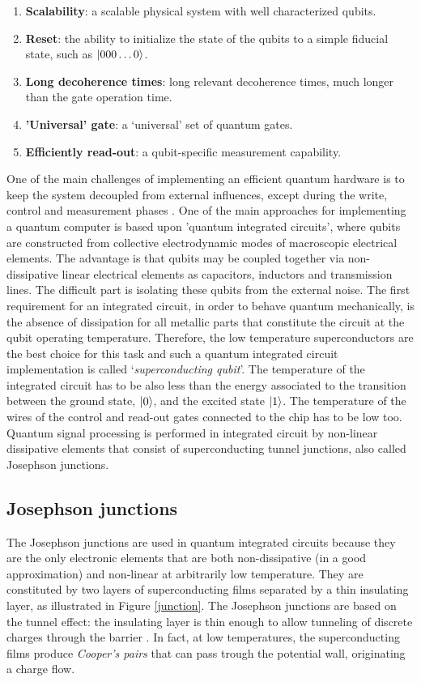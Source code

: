 \begin{enumerate}
	\item \textbf{Scalability}: a scalable physical system with well characterized qubits.
	\item \textbf{Reset}: the ability to initialize the state of the qubits to a simple fiducial state, such as $\left| 000\dots0 \right \rangle$.
	\item \textbf{Long decoherence times}: long relevant decoherence times, much longer than the gate operation time.	
	\item \textbf{'Universal' gate}: a `universal' set of quantum gates.
	\item \textbf{Efficiently read-out}: a qubit-specific measurement capability.
\end{enumerate}

One of the main challenges of implementing an efficient quantum hardware is to keep the system decoupled from external influences, except during the write, control and measurement phases \cite{Hardware} . One of the main approaches for implementing a quantum computer is based upon 'quantum integrated circuits', where qubits are constructed from collective electrodynamic modes of macroscopic electrical elements. The advantage is that qubits may be coupled together via non-dissipative linear electrical elements as capacitors, inductors and transmission lines. The difficult part is isolating these qubits from the external noise. 
The first requirement for an integrated circuit, in order to behave quantum mechanically, is the absence of dissipation for all metallic parts that constitute the circuit at the qubit operating temperature. 
Therefore, the low temperature superconductors are the best choice for this task and such a quantum integrated circuit implementation is called `\textit{superconducting qubit}'. The temperature of the integrated circuit has to be also less than the energy associated to the transition between the ground state, $\left| 0 \right \rangle$, and the excited state $\left| 1 \right \rangle$. The temperature of the wires of the control and read-out gates connected to the chip has to be low too. Quantum signal processing is performed in integrated circuit by non-linear dissipative elements that consist of superconducting tunnel junctions, also called Josephson junctions. 



\subsection{Josephson junctions}
The Josephson junctions are used in quantum integrated circuits because they are the only electronic elements that are both non-dissipative (in a good approximation) and non-linear at arbitrarily low temperature. 
They are constituted by two layers of superconducting films separated by a thin insulating layer, as illustrated in Figure \ref{junction}. The Josephson junctions are based on the tunnel effect: the insulating layer is thin enough to allow tunneling of discrete charges through the barrier \cite{Hardware2}. In fact, at low temperatures, the superconducting films produce \textit{Cooper's pairs} that can pass trough the potential wall, originating a charge flow.


